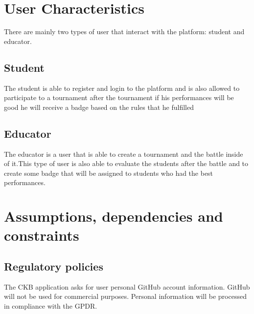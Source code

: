 \section{User Characteristics}
There are mainly two types of user that interact with the platform: student and educator.

\subsection{Student}
The student  is able to register and login to the platform and is also allowed to participate to a tournament after the tournament if his performances will be good he will receive a badge based on the rules that he fulfilled

\subsection{Educator}
The educator is a user that is able to create a tournament and the battle inside of it.This type of user is also able to evaluate the students after the battle and to create some badge that will be assigned to students who had the best performances.



\pagebreak
\section{Assumptions, dependencies and constraints}

\subsection{Regulatory policies}
The CKB application asks for user personal GitHub account information. GitHub will not be used for commercial purposes. Personal information will be processed in compliance with the GPDR.

